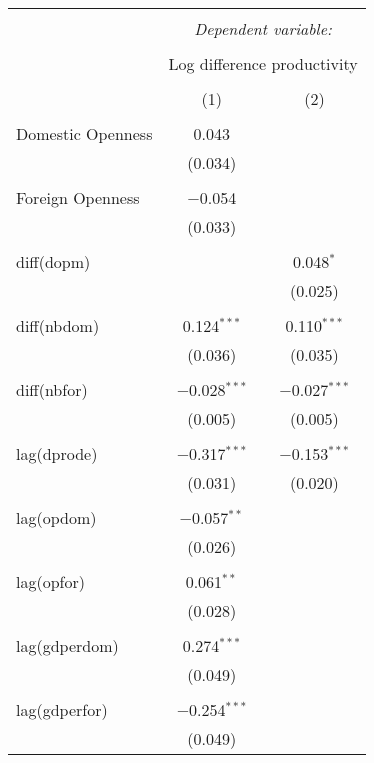 
\begin{tabular}{@{\extracolsep{5pt}}lcc} 
\\[-1.8ex]\hline 
\hline \\[-1.8ex] 
 & \multicolumn{2}{c}{\textit{Dependent variable:}} \\ 
\cline{2-3} 
\\[-1.8ex] & \multicolumn{2}{c}{Log difference productivity} \\ 
\\[-1.8ex] & (1) & (2)\\ 
\hline \\[-1.8ex] 
 Domestic Openness & 0.043 &  \\ 
  & (0.034) &  \\ 
  & & \\ 
 Foreign Openness & $-$0.054 &  \\ 
  & (0.033) &  \\ 
  & & \\ 
 diff(dopm) &  & 0.048$^{*}$ \\ 
  &  & (0.025) \\ 
  & & \\ 
 diff(nbdom) & 0.124$^{***}$ & 0.110$^{***}$ \\ 
  & (0.036) & (0.035) \\ 
  & & \\ 
 diff(nbfor) & $-$0.028$^{***}$ & $-$0.027$^{***}$ \\ 
  & (0.005) & (0.005) \\ 
  & & \\ 
 lag(dprode) & $-$0.317$^{***}$ & $-$0.153$^{***}$ \\ 
  & (0.031) & (0.020) \\ 
  & & \\ 
 lag(opdom) & $-$0.057$^{**}$ &  \\ 
  & (0.026) &  \\ 
  & & \\ 
 lag(opfor) & 0.061$^{**}$ &  \\ 
  & (0.028) &  \\ 
  & & \\ 
 lag(gdperdom) & 0.274$^{***}$ &  \\ 
  & (0.049) &  \\ 
  & & \\ 
 lag(gdperfor) & $-$0.254$^{***}$ &  \\ 
  & (0.049) &  \\ 

\end{tabular}
